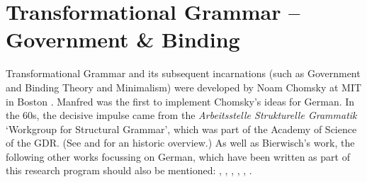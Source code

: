 

\chapter{Transformational Grammar -- Government \& Binding}
\label{Kapitel-GB}\label{chap-GB}\label{chap-gb}

Transformational Grammar and its subsequent incarnations (such as Government and Binding Theory
and Minimalism) were developed by Noam Chomsky at MIT in Boston \citep{Chomsky57a,Chomsky65a,Chomsky75a,Chomsky81a,Chomsky86b,Chomsky95a-u}.
Manfred \citet{Bierwisch63} was the first to implement Chomsky's ideas for German. In the 60s, the decisive impulse came from the 
\emph{Arbeitsstelle Strukturelle Grammatik} `Workgroup for Structural Grammar', which was part of the Academy of Science of the GDR. (See
 and  for an historic overview.)
As well as Bierwisch's work, the following other works focussing on German, which have been written as part of this research
program should also be mentioned: , , , , ,
.

